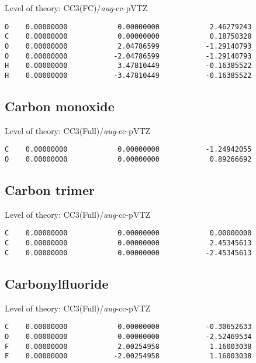 \documentclass[journal=jctcce,manuscript=article,layout=traditional]{achemso}
\newcommand{\AVTZ}{\emph{aug}-cc-pVTZ}
\begin{document}
\begin{singlespace}
Level of theory: CC3(FC)/{\AVTZ}
\begin{verbatim}
O    0.00000000            0.00000000            2.46279243
C    0.00000000            0.00000000            0.18750328
O    0.00000000            2.04786599           -1.29140793
O    0.00000000           -2.04786599           -1.29140793
H    0.00000000            3.47810449           -0.16385522
H    0.00000000           -3.47810449           -0.16385522
\end{verbatim}
\end{singlespace}

\subsection*{Carbon monoxide}

\begin{singlespace}
Level of theory: CC3(Full)/{\AVTZ}
\begin{verbatim}
C    0.00000000            0.00000000           -1.24942055
O    0.00000000            0.00000000            0.89266692
\end{verbatim}
\end{singlespace}

\subsection*{Carbon trimer}

\begin{singlespace}
Level of theory: CC3(Full)/{\AVTZ}
\begin{verbatim}
C    0.00000000            0.00000000            0.00000000
C    0.00000000            0.00000000            2.45345613
C    0.00000000            0.00000000           -2.45345613
\end{verbatim}
\end{singlespace}

\subsection*{Carbonylfluoride}

\begin{singlespace}
Level of theory: CC3(Full)/{\AVTZ}
\begin{verbatim}
C    0.00000000            0.00000000           -0.30652633
O    0.00000000            0.00000000           -2.52469534
F    0.00000000            2.00254958            1.16003038
F    0.00000000           -2.00254958            1.16003038
\end{verbatim}
\end{singlespace}
\end{document}

